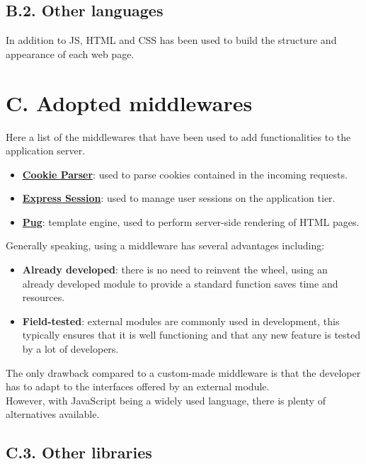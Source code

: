 \subsection{B.2. Other languages}

In addition to JS, HTML and CSS has been used to build the structure and appearance of each web page.

\section{C. Adopted middlewares}

Here a list of the middlewares that have been used to add functionalities to the application server.
\begin{itemize}
  \item \textbf{\href{https://www.npmjs.com/package/cookie-parser}{Cookie Parser}}: used to parse cookies contained in the incoming requests.
  \item \textbf{\href{https://www.npmjs.com/package/express-session}{Express Session}}: used to manage user sessions on the application tier.
  \item \textbf{\href{https://www.npmjs.com/package/pug}{Pug}}: template engine, used to perform server-side rendering of HTML pages.
\end{itemize}

Generally speaking, using a middleware has several advantages including:
\begin{itemize}
  \item \textbf{Already developed}: there is no need to reinvent the wheel, using an already developed module to provide a standard function saves time and resources.
  \item \textbf{Field-tested}: external modules are commonly used in development, this typically ensures that it is well functioning and that any new feature is tested by a lot of developers.
\end{itemize}
The only drawback compared to a custom-made middleware is that the developer has to adapt to the interfaces offered by an external module.\\
However, with JavaScript being a widely used language, there is plenty of alternatives available.

\subsection{C.3. Other libraries}

